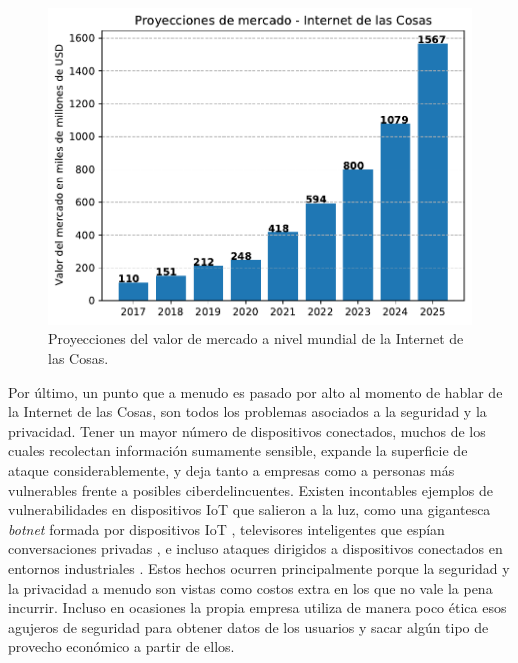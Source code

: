 \begin{figure}[h]
\centering
\includegraphics[width=\textwidth]{./Figures/iot_market_projection.pdf}
\caption[Proyecciones del valor de mercado a nivel mundial de la Internet de las Cosas.]{Proyecciones del valor de mercado a nivel mundial de la Internet de las Cosas.\footnotemark}
\label{fig:iot_market}
\end{figure}



Por último, un punto que a menudo es pasado por alto al momento de hablar de la Internet de las Cosas, son todos los problemas asociados a la seguridad y la privacidad. Tener un mayor número de dispositivos conectados, muchos de los cuales recolectan información sumamente sensible, expande la superficie de ataque considerablemente, y deja tanto a empresas como a personas más vulnerables frente a posibles ciberdelincuentes. Existen incontables ejemplos de vulnerabilidades en dispositivos IoT que salieron a la luz, como una gigantesca \emph{botnet} formada por dispositivos IoT \citep{3}, televisores inteligentes que espían conversaciones privadas \citep{4}, e incluso ataques dirigidos a dispositivos conectados en entornos industriales \citep{5}. Estos hechos ocurren principalmente porque la seguridad y la privacidad a menudo son vistas como costos extra en los que no vale la pena incurrir. Incluso en ocasiones la propia empresa utiliza de manera poco ética esos agujeros de seguridad para obtener datos de los usuarios y sacar algún tipo de provecho económico a partir de ellos.

